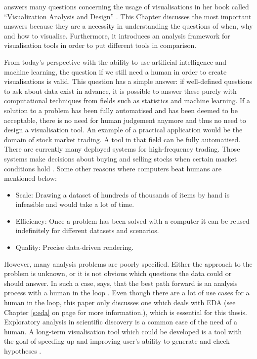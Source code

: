 \citeauthor{Munzner2014} answers many questions concerning the usage of visualisations in her book called ``Visualization Analysis and Design'' . This Chapter discusses the most important answers because they are a necessity in understanding the questions of when, why and how to visualise. Furthermore, it introduces an analysis framework for visualisation tools in order to
put different tools in comparison.

From today's perspective with the ability to use artificial intelligence and machine learning, the question if we still need a human in order to create visualisations is valid. This question has a simple answer: if well-defined questions to ask about data exist in advance, it is possible to answer these purely with computational techniques from fields such as statistics and machine learning. If a solution to a problem has been fully automatised and has been deemed to be acceptable, there is no need for human judgement anymore and thus no need to design a visualisation tool. An example of a practical application would be the domain of stock market trading. A tool in that field can be fully automatised. There are currently many deployed systems for high-frequency trading. Those systems make decisions about buying and selling stocks when certain market conditions hold . Some other reasons where computers beat humans are mentioned below:
\begin{itemize}
\item Scale: Drawing a dataset of hundreds of thousands of items by hand is infeasible and would take a lot of time.
\item Efficiency: Once a problem has been solved with a computer it can be reused  indefinitely for different datasets and scenarios.
\item Quality: Precise data-driven rendering.
\end{itemize}
However, many analysis problems are poorly specified. Either the approach to the problem is unknown, or it is not obvious which questions the data could or should answer. In such a case, \citeauthor{Munzner2014} says, that the best path forward is an analysis process with a human in the loop . Even though there are a lot of use cases for a human in the loop, this paper only discusses one which deals with \ac{EDA} (see Chapter \ref{s:eda} on page \pageref{s:eda} for more information.), which is essential for this thesis. Exploratory analysis in scientific discovery is a common case of the need of a human. A long-term visualisation tool which could be developed is a tool with the goal of speeding up and improving user's ability to generate and check hypotheses .

